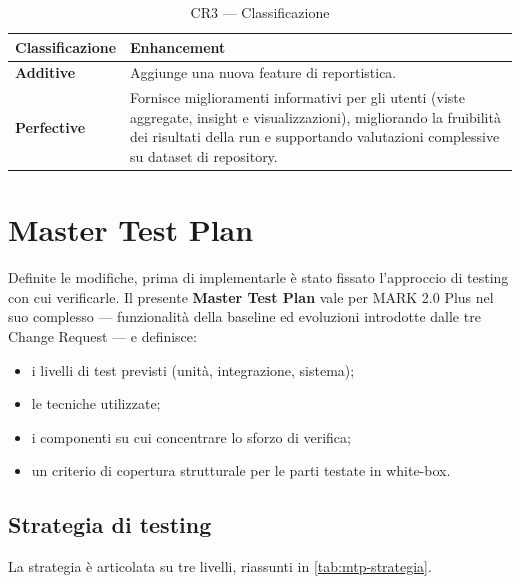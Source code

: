 \documentclass[11pt,a4paper]{article}
\newcommand{\projectName}{MARK 2.0 Plus}
\newcommand{\thead}[1]{\textbf{#1}}
\begin{document}
\begin{table}[H]
  \centering\small
  \caption{CR3 --- Classificazione}
  \label{tab:cr3-class}
  \begin{tabularx}{\linewidth}{@{}L{3.3cm} Y@{}}
    \toprule
    \thead{Classificazione} & \textbf{Enhancement}\\
    \midrule
    \thead{Additive} & Aggiunge una nuova feature di reportistica.\\
    \midrule
    \thead{Perfective} & Fornisce miglioramenti informativi per gli utenti
      (viste aggregate, insight e visualizzazioni), migliorando la fruibilit\`a
      dei risultati della run e supportando valutazioni complessive su dataset
      di repository.\\
    \bottomrule
  \end{tabularx}
\end{table}

\section{Master Test Plan}
\label{sec:mtp}

Definite le modifiche, prima di implementarle \`e stato fissato l'approccio di
testing con cui verificarle. Il presente \textbf{Master Test Plan} vale per
\projectName{} nel suo complesso --- funzionalit\`a della baseline ed evoluzioni
introdotte dalle tre Change Request --- e definisce:

\begin{itemize}[nosep]
  \item i livelli di test previsti (unit\`a, integrazione, sistema);
  \item le tecniche utilizzate;
  \item i componenti su cui concentrare lo sforzo di verifica;
  \item un criterio di copertura strutturale per le parti testate in white-box.
\end{itemize}

\subsection{Strategia di testing}
\label{sec:mtp-strategia}

La strategia \`e articolata su tre livelli, riassunti in
\cref{tab:mtp-strategia}.
\end{document}
